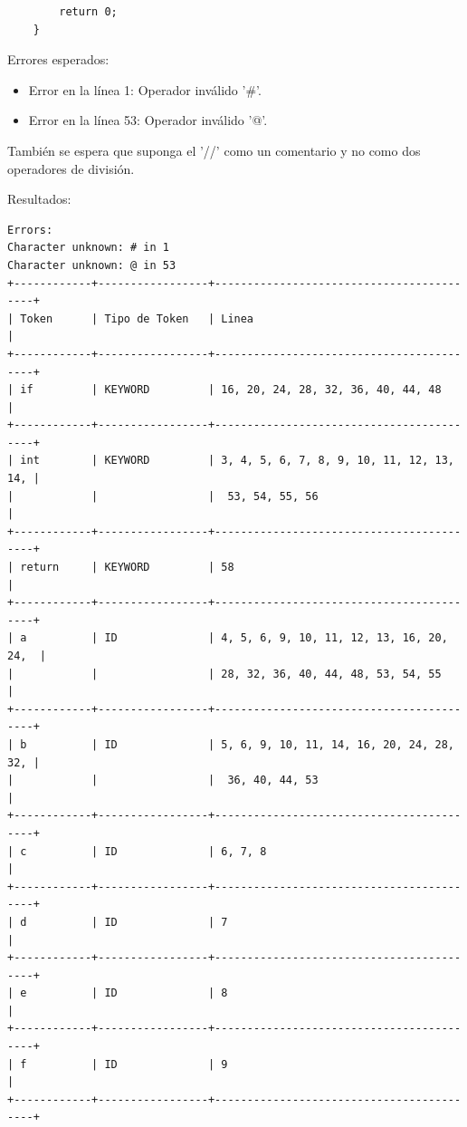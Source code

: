 \documentclass[a4paper,12pt]{article}
\begin{document}
\begin{flushleft}
\begin{verbatim}
        return 0;
    }
    \end{verbatim}
Errores esperados:
\begin{itemize}
    \item Error en la línea 1: Operador inválido '\#'.
    \item Error en la línea 53: Operador inválido '@'.
\end{itemize}
\hspace*{2em} También se espera que suponga el '//' como un comentario y 
no como dos operadores de división.\par\vspace{1em}
Resultados:
\begin{verbatim}
Errors: 
Character unknown: # in 1
Character unknown: @ in 53
+------------+-----------------+------------------------------------------+
| Token      | Tipo de Token   | Linea                                    |
+------------+-----------------+------------------------------------------+
| if         | KEYWORD         | 16, 20, 24, 28, 32, 36, 40, 44, 48       |
+------------+-----------------+------------------------------------------+
| int        | KEYWORD         | 3, 4, 5, 6, 7, 8, 9, 10, 11, 12, 13, 14, |
|            |                 |  53, 54, 55, 56                          |
+------------+-----------------+------------------------------------------+
| return     | KEYWORD         | 58                                       |
+------------+-----------------+------------------------------------------+
| a          | ID              | 4, 5, 6, 9, 10, 11, 12, 13, 16, 20, 24,  |
|            |                 | 28, 32, 36, 40, 44, 48, 53, 54, 55       |
+------------+-----------------+------------------------------------------+
| b          | ID              | 5, 6, 9, 10, 11, 14, 16, 20, 24, 28, 32, |
|            |                 |  36, 40, 44, 53                          |
+------------+-----------------+------------------------------------------+
| c          | ID              | 6, 7, 8                                  |
+------------+-----------------+------------------------------------------+
| d          | ID              | 7                                        |
+------------+-----------------+------------------------------------------+
| e          | ID              | 8                                        |
+------------+-----------------+------------------------------------------+
| f          | ID              | 9                                        |
+------------+-----------------+------------------------------------------+

\end{verbatim}
\end{flushleft}
\end{document}
